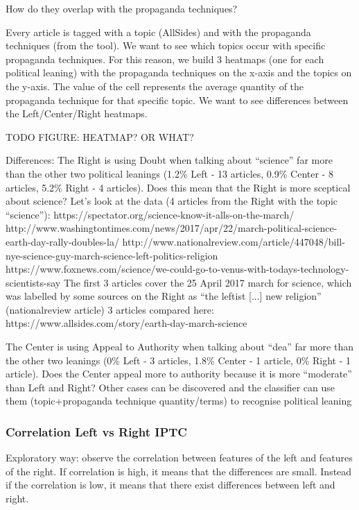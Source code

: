How do they overlap with the propaganda techniques?

Every article is tagged with a topic (AllSides) and with the propaganda techniques (from the tool).
We want to see which topics occur with specific propaganda techniques.
For this reason, we build 3 heatmaps (one for each political leaning) with the propaganda techniques on the x-axis and the topics on the y-axis. The value of the cell represents the average quantity of the propaganda technique for that specific topic.
We want to see differences between the Left/Center/Right heatmaps.

TODO FIGURE: HEATMAP? OR WHAT?

Differences:
The Right is using Doubt when talking about “science” far more than the other two political leanings (1.2\% Left - 13 articles, 0.9\% Center - 8 articles, 5.2\% Right - 4 articles). Does this mean that the Right is more sceptical about science? Let’s look at the data (4 articles from the Right with the topic “science”):
https://spectator.org/science-know-it-alls-on-the-march/
http://www.washingtontimes.com/news/2017/apr/22/march-political-science-earth-day-rally-doubles-la/ 
http://www.nationalreview.com/article/447048/bill-nye-science-guy-march-science-left-politics-religion
https://www.foxnews.com/science/we-could-go-to-venus-with-todays-technology-scientists-say 
The first 3 articles cover the 25 April 2017 march for science, which was labelled by some sources on the Right as “the leftist [...] new religion” (nationalreview article)
3 articles compared here: https://www.allsides.com/story/earth-day-march-science 

The Center is using Appeal to Authority when talking about “dea” far more than the other two leanings (0\% Left - 3 articles, 1.8\% Center - 1 article, 0\% Right - 1 article). Does the Center appeal more to authority because it is more “moderate” than Left and Right?
Other cases can be discovered and the classifier can use them (topic+propaganda technique quantity/terms) to recognise political leaning

\subsubsection{Correlation Left vs Right IPTC}
Exploratory way: observe the correlation between features of the left and features of the right. If correlation is high, it means that the differences are small. Instead if the correlation is low, it means that there exist differences between left and right.


